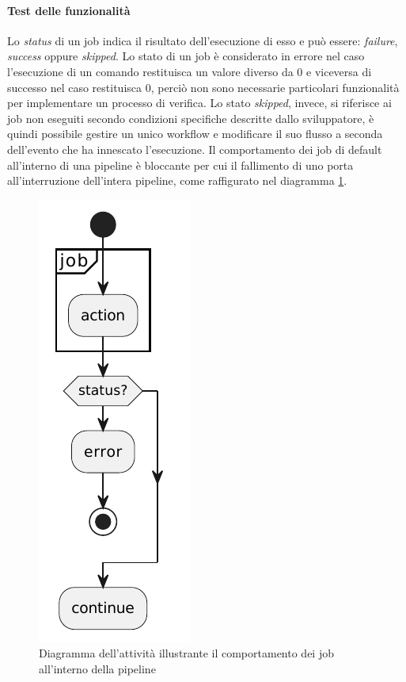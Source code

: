 \paragraph{Test delle funzionalità} Lo \textit{status} di un job indica il risultato dell'esecuzione di esso e può essere: \textit{failure}, \textit{success} oppure \textit{skipped}. Lo stato di un job è considerato in errore nel caso l'esecuzione di un comando restituisca un valore diverso da 0 e viceversa di successo nel caso restituisca 0, perciò non sono necessarie particolari funzionalità per implementare un processo di verifica. Lo stato \textit{skipped}, invece, si riferisce ai job non eseguiti secondo condizioni specifiche descritte dallo sviluppatore, è quindi possibile gestire un unico workflow e modificare il suo flusso a seconda dell'evento che ha innescato l'esecuzione. Il comportamento dei job di default all'interno di una pipeline è bloccante per cui il fallimento di uno porta all'interruzione dell'intera pipeline, come raffigurato nel diagramma \ref{fig:activity-diagram-job}.
\begin{figure}[htb]
	\centering
	\includegraphics[width=.18\linewidth]{figures/activity-diagram-job.pdf}
	\caption{Diagramma dell'attività illustrante il comportamento dei job all'interno della pipeline}
	\label{fig:activity-diagram-job}
\end{figure}

